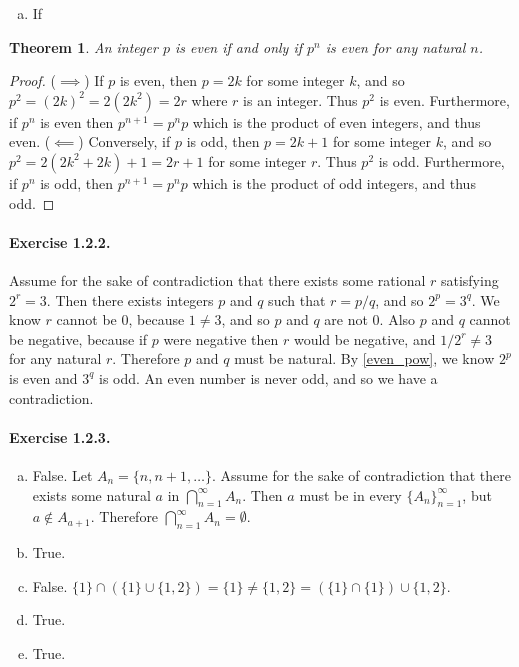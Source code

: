 \documentclass{article}
\newtheorem{theorem}{Theorem}[section]
\begin{document}
\begin{enumerate}[(a)]
    \item If 
\end{enumerate}

\begin{theorem}
\label{even_pow}
    An integer $p$ is even if and only if $p^n$ is even for any natural $n$.
\end{theorem}
\begin{proof}
    ($\implies$) If $p$ is even, then $p=2k$ for some integer $k$, and so $p^2=(2k)^2=2(2k^2)=2r$ where $r$ is an integer. Thus $p^2$ is even. Furthermore, if $p^n$ is even then $p^{n+1}=p^np$ which is the product of even integers, and thus even. ($\impliedby$) Conversely, if $p$ is odd, then $p=2k+1$ for some integer $k$, and so $p^2=2(2k^2+2k)+1=2r+1$ for some integer $r$. Thus $p^2$ is odd. Furthermore, if $p^n$ is odd, then $p^{n+1}=p^np$ which is the product of odd integers, and thus odd.
\end{proof}

\paragraph{Exercise 1.2.2.} Assume for the sake of contradiction that there exists some rational $r$ satisfying $2^r=3$. Then there exists integers $p$ and $q$ such that $r=p/q$, and so $2^p=3^q$. We know $r$ cannot be 0, because $1 \neq 3$, and so $p$ and $q$ are not 0. Also $p$ and $q$ cannot be negative, because if $p$ were negative then $r$ would be negative, and $1/2^r \neq 3$ for any natural $r$. Therefore $p$ and $q$ must be natural. By \autoref{even_pow}, we know $2^p$ is even and $3^q$ is odd. An even number is never odd, and so we have a contradiction.

\paragraph{Exercise 1.2.3.} 
\begin{enumerate}[(a)]
    \item False. Let $A_n=\{n,n+1,\dots\}$. Assume for the sake of contradiction that there exists some natural $a$ in $\bigcap_{n=1}^\infty A_n$. Then $a$ must be in every $\{A_n\}_{n=1}^\infty$, but $a \notin A_{a+1}$. Therefore $\bigcap_{n=1}^\infty A_n = \emptyset$.
    \item True.
    \item False. $\{1\} \cap (\{1\}\cup\{1,2\}) = \{1\} \neq \{1,2\}=(\{1\}\cap\{1\})\cup\{1,2\}.$
    \item True.
    \item True.
\end{enumerate}
\end{document}
